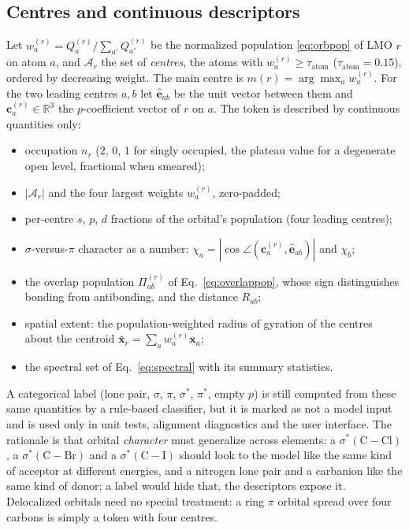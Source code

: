 \documentclass[11pt,a4paper]{article}
\newcommand{\R}{\mathbb{R}}
\newcommand{\vb}[1]{\bm{#1}}
\begin{document}
\subsection{Centres and continuous descriptors}
Let $w^{(r)}_a=Q^{(r)}_a/\sum_{a'}Q^{(r)}_{a'}$ be the normalized population \eqref{eq:orbpop} of LMO $r$ on atom $a$, and $\mathcal{A}_r$ the set of \emph{centres}, the atoms with $w^{(r)}_a\ge\tau_{\mathrm{atom}}$ ($\tau_{\mathrm{atom}}=0.15$), ordered by decreasing weight. The main centre is $m(r)=\arg\max_a w^{(r)}_a$. For the two leading centres $a,b$ let $\hat{\vb{e}}_{ab}$ be the unit vector between them and $\vb{c}^{(r)}_a\in\R^3$ the $p$-coefficient vector of $r$ on $a$. The token is described by continuous quantities only:
\begin{itemize}[nosep]
\item occupation $n_r$ ($2$, $0$, $1$ for singly occupied, the plateau value for a degenerate open level, fractional when smeared);
\item $|\mathcal{A}_r|$ and the four largest weights $w^{(r)}_a$, zero-padded;
\item per-centre $s$, $p$, $d$ fractions of the orbital's population (four leading centres);
\item $\sigma$-versus-$\pi$ character as a number: $\chi_a=|\cos\angle(\vb{c}^{(r)}_a,\hat{\vb{e}}_{ab})|$ and $\chi_b$;
\item the overlap population $\Pi^{(r)}_{ab}$ of Eq.~\eqref{eq:overlappop}, whose sign distinguishes bonding from antibonding, and the distance $R_{ab}$;
\item spatial extent: the population-weighted radius of gyration of the centres about the centroid $\bar{\vb{x}}_r=\sum_a w^{(r)}_a\vb{x}_a$;
\item the spectral set of Eq.~\eqref{eq:spectral} with its summary statistics.
\end{itemize}
A categorical label (lone pair, $\sigma$, $\pi$, $\sigma^*$, $\pi^*$, empty $p$) is still computed from these same quantities by a rule-based classifier, but it is marked as not a model input and is used only in unit tests, alignment diagnostics and the user interface. The rationale is that orbital \emph{character} must generalize across elements: a $\sigma^*(\mathrm{C{-}Cl})$, a $\sigma^*(\mathrm{C{-}Br})$ and a $\sigma^*(\mathrm{C{-}I})$ should look to the model like the same kind of acceptor at different energies, and a nitrogen lone pair and a carbanion like the same kind of donor; a label would hide that, the descriptors expose it. Delocalized orbitals need no special treatment: a ring $\pi$ orbital spread over four carbons is simply a token with four centres.
\end{document}
